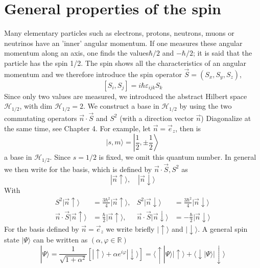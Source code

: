 \section{General properties of the spin}
Many elementary particles such as electrons, protons, neutrons, muons or neutrinos have an 'inner' angular momentum. If one measures these angular momentum along an axis, one finds the values ​​$\hbar/2$ and $-\hbar/2$; it is said that the particle has the spin 1/2. The spin shows all the characteristics of an angular momentum and we therefore introduce the spin operator $\vec{S}=(S_x, S_y, S_z)$,
\begin{equation}
    \left[S_{i}, S_{j}\right]=i \hbar \varepsilon_{i j k} S_{k}
    \end{equation}
Since only two values ​​are measured, we introduced the abstract Hilbert space $\mathcal{H}_{1/2}$, with dim $\mathcal{H}_{1/2} = 2$. We construct a base in $\mathcal{H}_{1/2}$ by using the two commutating operators $\vec{n}\cdot\vec{S}$ and $S^2$ (with a direction vector $\vec{n}$) Diagonalize at the same time, see Chapter 4. For example, let $\vec{n}=\vec{e}_z$, then is
\begin{equation}
    |s, m\rangle=\left|\frac{1}{2}, \pm \frac{1}{2}\right\rangle
    \end{equation}
a base in $\mathcal{H}_{1/2}$. Since $s = 1/2$ is fixed, we omit this quantum number. In general we then write for the basis, which is defined by $\vec{n} \cdot \vec{S}, S^{2}$ as
\begin{equation}
    |\vec{n} \uparrow\rangle, \quad|\vec{n} \downarrow\rangle
    \end{equation}
With
\begin{equation}
\begin{aligned} S^{2}|\vec{n} \uparrow\rangle &=\frac{3 \hbar^{2}}{4}|\vec{n} \uparrow\rangle, & S^{2}|\vec{n} \downarrow\rangle &=\frac{3 \hbar^{2}}{4}|\vec{n} \downarrow\rangle \\ \vec{n} \cdot \vec{S}|\vec{n} \uparrow\rangle &=\frac{\hbar}{2}|\vec{n} \uparrow\rangle, & \vec{n} \cdot \vec{S}|\vec{n} \downarrow\rangle &=-\frac{\hbar}{2}|\vec{n} \downarrow\rangle \end{aligned}\nonumber
\end{equation}
For the basis defined by $\vec{n}=\vec{e}_z$ we write briefly $|\uparrow\rangle$ and $ |\downarrow\rangle$. A general spin state $| \Psi\rangle$ can be written as $(\alpha,\varphi\in\mathbb{R})$
\begin{equation}
    |\Psi\rangle=\frac{1}{\sqrt{1+\alpha^{2}}}\left[|\uparrow\rangle+\alpha e^{i \varphi}|\downarrow\rangle\right]=\langle\uparrow | \Psi\rangle|\uparrow\rangle+\langle\downarrow | \Psi\rangle|\downarrow\rangle
    \end{equation}
